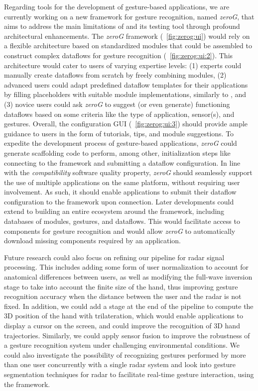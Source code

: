 Regarding tools for the development of gesture-based applications, we are currently working on a new framework for gesture recognition, named \textit{zeroG}, that aims to address the main limitations of \ql and its testing tool through profound architectural enhancements.
%
The \textit{zeroG} framework (\fig~\ref{fig:zerog:ui}) would rely on a flexible architecture based on standardized modules that could be assembled to construct complex dataflows for gesture recognition (\fig~\ref{fig:zerog:ui:2}). 
%
This architecture would cater to users of varying expertise levels: (1) experts could manually create dataflows from scratch by freely combining modules, (2) advanced users could adapt predefined dataflow templates for their applications by filling placeholders with suitable module implementations, similarly to \ql, and (3) novice users could ask \textit{zeroG} to suggest (or even generate) functioning dataflows based on some criteria like the type of application, sensor(s), and gestures.
%
Overall, the configuration GUI (\fig~\ref{fig:zerog:ui:3}) should provide ample guidance to users in the form of tutorials, tips, and module suggestions. 
%
To expedite the development process of gesture-based applications, \textit{zeroG} could generate scaffolding code to perform, among other, initialization steps like connecting to the framework and submitting a dataflow configuration.
%
In line with the \textit{compatibility} software quality property, \textit{zeroG} should seamlessly support the use of multiple applications on the same platform, without requiring user involvement. As such, it should enable applications to submit their dataflow configuration to the framework upon connection.
%
Later developments could extend to building an entire ecosystem around the framework, including databases of modules, gestures, and dataflows. This would facilitate access to components for gesture recognition and would allow \textit{zeroG} to automatically download missing components required by an application.

Future research could also focus on refining our pipeline for radar signal processing.
%
This includes adding some form of user normalization to account for anatomical differences between users, as well as modifying the full-wave inversion stage to take into account the finite size of the hand, thus improving gesture recognition accuracy when the distance between the user and the radar is not fixed.
% 
In addition, we could add a stage at the end of the pipeline to compute the 3D position of the hand with trilateration, which would enable applications to display a cursor on the screen, and could improve the recognition of 3D hand trajectories.
%
Similarly, we could apply sensor fusion to improve the robustness of a gesture recognition system under challenging environmental conditions.
% 
We could also investigate the possibility of recognizing gestures performed by more than one user concurrently with a single radar system and look into gesture segmentation techniques for radar to facilitate real-time gesture interaction, \eg using the \ql framework.

